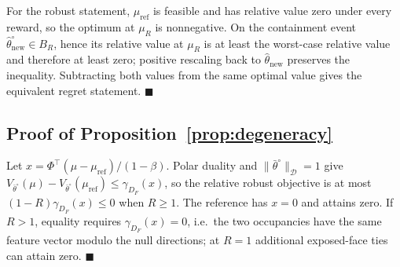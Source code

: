 \documentclass{article}
\newcommand{\Dnorm}[1]{\|#1\|_{\mathcal D}}
\begin{document}
For the robust statement, $\mu_{\mathrm{ref}}$ is feasible and has relative
value zero under every reward, so the optimum at $\mu_R$ is nonnegative. On the
containment event $\hat\theta_{\mathrm{new}}^\circ\in B_R$, hence its relative
value at $\mu_R$ is at least the worst-case relative value and therefore at
least zero; positive rescaling back to $\hat\theta_{\mathrm{new}}$ preserves the
inequality. Subtracting both values from the same optimal value gives the
equivalent regret statement. $\blacksquare$

\subsection{Proof of Proposition~\ref{prop:degeneracy}}

Let $x=\Phi^\top(\mu-\mu_{\mathrm{ref}})/(1-\beta)$. Polar duality and
$\Dnorm{\bar\theta^\circ}=1$ give
$V_{\bar\theta^\circ}(\mu)-V_{\bar\theta^\circ}(\mu_{\mathrm{ref}})
\le\gamma_{D_F}(x)$, so the relative robust objective is at most
$(1-R)\gamma_{D_F}(x)\le0$ when $R\ge1$. The reference has $x=0$ and attains
zero. If $R>1$, equality requires $\gamma_{D_F}(x)=0$, i.e.\ the two occupancies
have the same feature vector modulo the null directions; at $R=1$ additional
exposed-face ties can attain zero. $\blacksquare$


\end{document}
